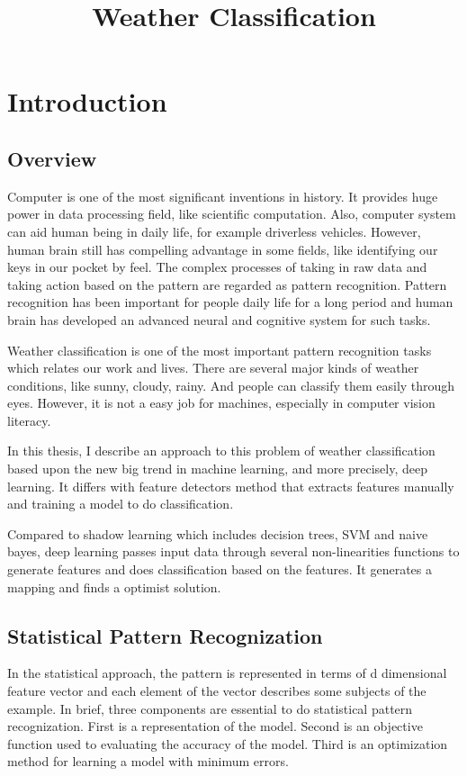 \title  {Weather Classification}
\chapter{Introduction} %
\label{Chapter1}


\section{Overview}

Computer is one of the most significant inventions in history. It provides huge power in data processing field, like scientific computation. Also, computer system can aid human being in daily life, for example driverless vehicles. However, human brain still has compelling advantage in some fields, like identifying our keys in our pocket by feel. The complex processes of taking in raw data and taking action based on the pattern are regarded as pattern recognition. Pattern recognition has been important for people daily life for a long period and human brain has developed an advanced neural and cognitive system for such tasks.

Weather classification is one of the most important pattern recognition tasks which relates our work and lives. There are several major kinds of weather conditions, like sunny, cloudy, rainy. And people can classify them easily through eyes. However, it is not a easy job for machines, especially in computer vision literacy. 

In this thesis, I describe an approach to this problem of weather classification based upon the new big trend in machine learning, and more precisely, deep learning. It differs with feature detectors method that extracts features manually and training a model to do classification.  

Compared to shadow learning which includes decision trees, SVM and naive bayes, deep learning passes input data through several non-linearities functions to generate features and does classification based on the features. It generates a mapping and finds a optimist solution.

\section{Statistical Pattern Recognization}

In the statistical approach, the pattern is represented in terms of d dimensional feature vector and each element of the vector describes some subjects of the example. In brief, three components are essential to do statistical pattern recognization. First is a representation of the model. Second is an objective function used to evaluating the accuracy of the model. Third is an optimization method for learning a model with minimum errors.

